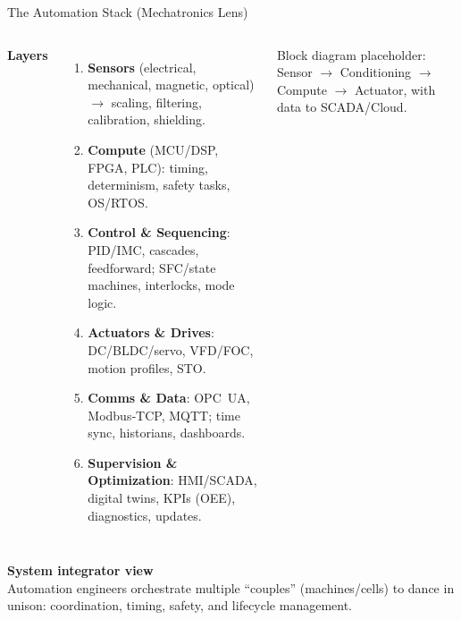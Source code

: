 \begin{frame}{The Automation Stack (Mechatronics Lens)}
\begin{columns}[T,onlytextwidth]
\textbf{Layers}
\begin{enumerate}
  \item \textbf{Sensors} (electrical, mechanical, magnetic, optical) $\rightarrow$ scaling, filtering, calibration, shielding.
  \item \textbf{Compute} (MCU/DSP, FPGA, PLC): timing, determinism, safety tasks, OS/RTOS.
  \item \textbf{Control \& Sequencing}: PID/IMC, cascades, feedforward; SFC/state machines, interlocks, mode logic.
  \item \textbf{Actuators \& Drives}: DC/BLDC/servo, VFD/FOC, motion profiles, STO.
  \item \textbf{Comms \& Data}: OPC~UA, Modbus‐TCP, MQTT; time sync, historians, dashboards.
  \item \textbf{Supervision \& Optimization}: HMI/SCADA, digital twins, KPIs (OEE), diagnostics, updates.
\end{enumerate}

\centering
\footnotesize{Block diagram placeholder: Sensor $\to$ Conditioning $\to$ Compute $\to$ Actuator, with data to SCADA/Cloud.}
\end{columns}

\vspace{1mm}
\textbf{System integrator view} \\
Automation engineers orchestrate multiple “couples” (machines/cells) to dance in unison: coordination, timing, safety, and lifecycle management.
\end{frame}


